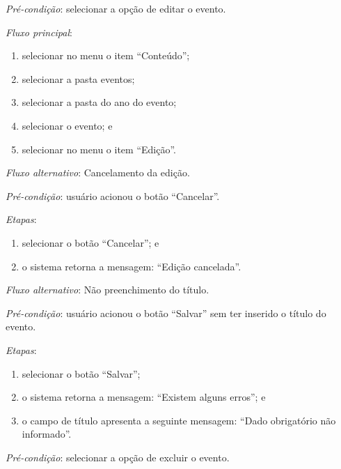 \vspace{0.7cm}

\noindent \textit{Pré-condição}: selecionar a opção de editar o evento.

\noindent \textit{Fluxo principal}:

\begin{enumerate}
    \item selecionar no menu o item ``Conteúdo'';
    \item selecionar a pasta eventos;
    \item selecionar a pasta do ano do evento;
    \item selecionar o evento; e
    \item selecionar no menu o item ``Edição''.
\end{enumerate}

\noindent \textit{Fluxo alternativo}: Cancelamento da edição.

\noindent \textit{Pré-condição}: usuário acionou o botão ``Cancelar''.

\noindent \textit{Etapas}:

\begin{enumerate}
    \item selecionar o botão ``Cancelar''; e
    \item o sistema retorna a mensagem: ``Edição cancelada''.
\end{enumerate}

\noindent \textit{Fluxo alternativo}: Não preenchimento do título.

\noindent \textit{Pré-condição}: usuário acionou o botão ``Salvar'' sem ter inserido o título do evento.

\noindent \textit{Etapas}:

\begin{enumerate}
    \item selecionar o botão ``Salvar'';
    \item o sistema retorna a mensagem: ``Existem alguns erros''; e
    \item o campo de título apresenta a seguinte mensagem: ``Dado obrigatório não informado''.
\end{enumerate}



\vspace{0.7cm}

\noindent \textit{Pré-condição}: selecionar a opção de excluir o evento.

